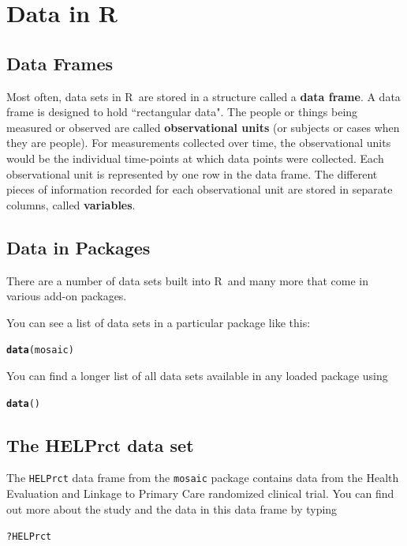 \documentclass[twoside]{book}\usepackage[]{graphicx}\usepackage[]{xcolor}
\makeatletter
\newcommand{\hlopt}[1]{\textcolor[rgb]{0,0,0}{#1}}%
\newcommand{\hlstd}[1]{\textcolor[rgb]{0.345,0.345,0.345}{#1}}%
\newcommand{\hlkwd}[1]{\textcolor[rgb]{0.737,0.353,0.396}{\textbf{#1}}}%
\newenvironment{kframe}{%
 \def\at@end@of@kframe{}%
 \ifinner\ifhmode%
  \def\at@end@of@kframe{\end{minipage}}%
  \begin{minipage}{\columnwidth}%
 \fi\fi%
 \def\FrameCommand##1{\hskip\@totalleftmargin \hskip-\fboxsep
 \colorbox{shadecolor}{##1}\hskip-\fboxsep
     \hskip-\linewidth \hskip-\@totalleftmargin \hskip\columnwidth}%
 \MakeFramed {\advance\hsize-\width
   \@totalleftmargin\z@ \linewidth\hsize
   \@setminipage}}%
 {\par\unskip\endMakeFramed%
 \at@end@of@kframe}
\newenvironment{knitrout}{}{} %
\newcommand{\Rindex}[1]{\index{\texttt{#1}}}
\newcommand{\dataframe}[1]{{\color{blue!80!black}\texttt{#1}}\Rindex{#1}}
\newcommand{\pkg}[1]{{\color{red!80!black}\texttt{#1}}\Rindex{#1}}
\def\R{{\sf R}}
\def\term#1{\textbf{#1}}
\makeatother
\begin{document}
\section{Data in \R}

\subsection{Data Frames}
Most often, data sets in \R\ are stored in a structure called a 
\term{data frame}.  A data frame is designed to hold ``rectangular data".  The people or things
being measured or observed are called \term{observational units} (or subjects or cases when 
they are people).  For measurements collected over time, the observational units would be the individual 
time-points at which data points were collected. Each observational unit is represented by one row in the data frame.
The different pieces of information recorded for each observational unit are stored in
separate columns, called \term{variables}.  

\subsection{Data in Packages}
There are a number of data sets built into \R\
and many more that come in various add-on packages.  

You can see a list of data sets in a particular package like this:
\begin{knitrout}
\color{fgcolor}\begin{kframe}
\begin{alltt}
\hlkwd{data}\hlstd{(mosaic)}
\end{alltt}
\end{kframe}
\end{knitrout}

You can find a longer list of all data sets available in any loaded package
using 
\begin{knitrout}
\color{fgcolor}\begin{kframe}
\begin{alltt}
\hlkwd{data}\hlstd{()}
\end{alltt}
\end{kframe}
\end{knitrout}


\subsection{The HELPrct data set}
The \dataframe{HELPrct} data frame from the \pkg{mosaic} package
contains data from the Health Evaluation and Linkage to Primary Care
randomized clinical trial.  You can find out more about the study and
the data in this data frame by typing
\begin{knitrout}
\color{fgcolor}\begin{kframe}
\begin{alltt}
\hlopt{?}\hlstd{HELPrct}
\end{alltt}
\end{kframe}
\end{knitrout}
\end{document}
